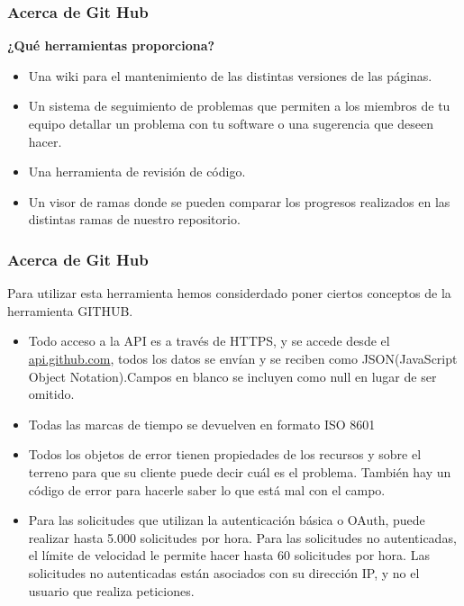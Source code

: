 \documentclass[8pt]{beamer}
\begin{document}
\begin{frame}
\frametitle{Acerca de Git Hub}
\textbf{¿Qué herramientas proporciona?}\\
\begin{itemize}
\item Una wiki para el mantenimiento de las distintas versiones de las páginas.
\item Un sistema de seguimiento de problemas que permiten a los miembros de tu equipo detallar un problema con tu software o una sugerencia que deseen hacer.
\item Una herramienta de revisión de código.
\item Un visor de ramas donde se pueden comparar los progresos realizados en las distintas ramas de nuestro repositorio.
\end{itemize}
\end{frame}


\begin{frame}
\frametitle{Acerca de Git Hub}
Para utilizar esta herramienta hemos considerdado poner ciertos conceptos de la herramienta GITHUB.
\begin{itemize}
\justifying
\item {Todo acceso a la API es a través de HTTPS, y se accede desde el \url{api.github.com}, todos los datos se envían y se reciben como JSON(JavaScript Object Notation).Campos en blanco se incluyen como null en lugar de ser omitido.}
\justifying
\item {Todas las marcas de tiempo se devuelven en formato ISO 8601}
\justifying
\item {Todos los objetos de error tienen propiedades de los recursos y sobre el terreno para que su cliente puede decir cuál es el problema. También hay un código de error para hacerle saber lo que está mal con el campo.}
\justifying
\item {Para las solicitudes que utilizan la autenticación básica o OAuth, puede realizar hasta 5.000 solicitudes por hora. Para las solicitudes no autenticadas, el límite de velocidad le permite hacer hasta 60 solicitudes por hora. Las solicitudes no autenticadas están asociados con su dirección IP, y no el usuario que realiza peticiones.}
\end{itemize}
\end{frame}
\end{document}
